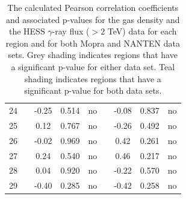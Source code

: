 \documentclass[12pt,a4paper]{article}
\begin{document}
\begin{appendices}
\begin{table}[H]
\begin{tabular}{ccccccccc}
		24 && -0.25 & 0.514 & no && -0.08 & 0.837 & no \\
		25 && 0.12 & 0.767 & no && -0.26 & 0.492 & no \\
		26 && -0.02 & 0.969 & no && 0.42 & 0.261 & no \\ 
		27 && 0.24 & 0.540 & no && 0.46 & 0.217 & no \\
		28 && 0.04 & 0.920 & no && -0.22 & 0.570 & no \\
		29 && -0.40 & 0.285 & no && -0.42 & 0.258 & no \\
		\hline 
	\end{tabular} 
	\caption{The calculated Pearson correlation coefficients and associated p-values for the gas density and the HESS $\gamma$-ray flux ($> 2$ TeV) data for each region and for both Mopra and NANTEN data sets. Grey shading indicates regions that have a significant p-value for either data set. Teal shading indicates regions that have a significant p-value for both data sets.}
	\label{tab:gasgammacor}
\end{table}

\end{appendices}
\end{document}
